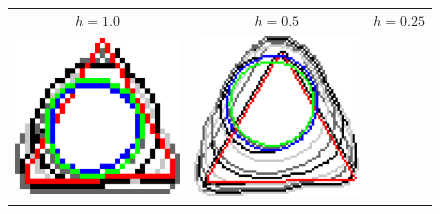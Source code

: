 \begin{figure}[hp!]
	\center
	\begin{tabular}{ccc}
		$h=1.0$ & $h=0.5$ & $h=0.25$ \\[2em]
	\includegraphics[scale=0.185]{figures/chapter5/flow/triangle/radius_5/ii/elastica/len_pen_0.01000/jonctions_1/curve_segs_4/best/gs_1.00000/summary.pdf} &
	\includegraphics[scale=0.185]{figures/chapter5/flow/triangle/radius_5/ii/elastica/len_pen_0.01000/jonctions_1/curve_segs_4/best/gs_0.50000/summary.pdf} &

\end{tabular}
\end{figure}

